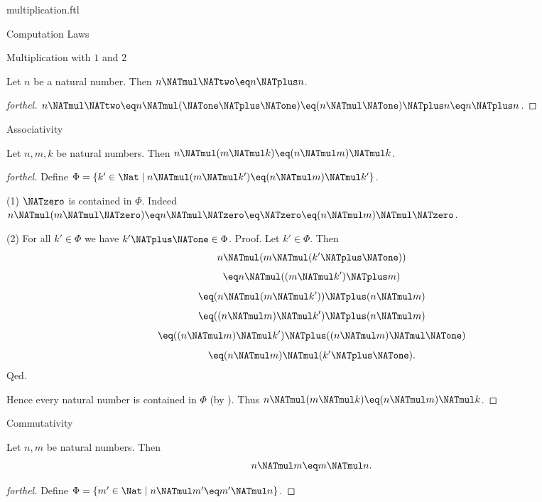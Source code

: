 \documentclass{naproche-library}
\begin{document}
\begin{smodule}[title=Multiplication]{multiplication.ftl}
\begin{sfragment}{Computation Laws}
\begin{sfragment}{Multiplication with $1$ and $2$}
    \begin{corollary}[forthel,id=ARITHMETIC_06_5679541582299136]
      Let $n$ be a natural number.
      Then $n \NATmul \NATtwo \eq n \NATplus n$.
    \end{corollary}
    \begin{proof}[forthel]
      $n \NATmul \NATtwo
        \eq n \NATmul (\NATone \NATplus \NATone)
        \eq (n \NATmul \NATone) \NATplus n
        \eq n \NATplus n$.
    \end{proof}
  \end{sfragment}

  \begin{sfragment}{Associativity}
    \begin{proposition}[forthel,id=ARITHMETIC_06_347295585402880]
      Let $n, m, k$ be natural numbers.
      Then $n \NATmul (m \NATmul k) \eq (n \NATmul m) \NATmul k$.
    \end{proposition}
    \begin{proof}[forthel]
      Define $\Phi = \{ k' \in \Nat \mid n \NATmul (m \NATmul k') \eq (n \NATmul m) \NATmul k' \}$.

      (1) $\NATzero$ is contained in $\Phi$.
      Indeed $n \NATmul (m \NATmul \NATzero)
        \eq n \NATmul \NATzero
        \eq \NATzero
        \eq (n \NATmul m) \NATmul \NATzero$.

      (2) For all $k' \in \Phi$ we have $k' \NATplus \NATone \in \Phi$. \newline
      Proof.
        Let $k' \in \Phi$.
        Then
        \[  n \NATmul (m \NATmul (k' \NATplus \NATone))                          \]
        \[    \eq n \NATmul ((m \NATmul k') \NATplus m)                      \]
        \[    \eq (n \NATmul (m \NATmul k')) \NATplus (n \NATmul m)            \]
        \[    \eq ((n \NATmul m) \NATmul k') \NATplus (n \NATmul m)            \]
        \[    \eq ((n \NATmul m) \NATmul k') \NATplus ((n \NATmul m) \NATmul \NATone)  \]
        \[    \eq (n \NATmul m) \NATmul (k' \NATplus \NATone).                     \]
      Qed.

      Hence every natural number is contained in $\Phi$ (by ).
      Thus $n \NATmul (m \NATmul k) \eq (n \NATmul m) \NATmul k$.
    \end{proof}
  \end{sfragment}

  \begin{sfragment}{Commutativity}
    \begin{proposition}[forthel,id=ARITHMETIC_06_1764759896588288]
      Let $n, m$ be natural numbers.
      Then \[ n \NATmul m \eq m \NATmul n. \]
    \end{proposition}
    \begin{proof}[forthel]
      Define $\Phi = \{ m' \in \Nat \mid n \NATmul m' \eq m' \NATmul n \}$.


\end{proof}
\end{sfragment}
\end{sfragment}
\end{smodule}
\end{document}
